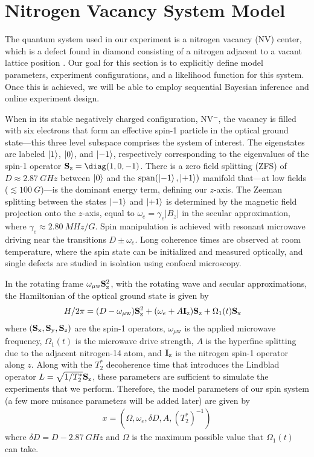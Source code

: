 \documentclass[aps,nofootinbib,twocolumn,superscriptaddress]{revtex4}
\newcommand{\mps}{x}
\renewcommand{\H}{H}    %
\renewcommand{\L}{L}    %
\newcommand{\uw}{{\mu\text{w}}}
\begin{document}
\section{Nitrogen Vacancy System Model}
\label{sec:system-model}

The quantum system used in our experiment is a nitrogen vacancy (NV) center,
which is a defect found in diamond consisting of a nitrogen adjacent to
a vacant lattice position \cite{doherty_nitrogen-vacancy_2013}.
Our goal for this section is to explicitly define model parameters, experiment configurations, and a likelihood function for this system.
Once this is achieved, we will be able to employ sequential
Bayesian inference and online experiment design.

When in its stable negatively charged configuration, NV$^-$,
the vacancy is filled with
six electrons that form an effective spin-1 particle in the optical
ground state---this three level subspace comprises the system of interest.
The eigenstates are labeled $\ket{1}$, $\ket{0}$, and $\ket{-1}$, respectively
corresponding to the eigenvalues of the spin-1 operator $\Sz=\diag(1,0,-1)$.
There is a zero field splitting (ZFS) of $D\approx\SI{2.87}{GHz}$
between $\ket{0}$ and the $\operatorname{span}(\ket{-1},\ket{+1})$ manifold
that---at low fields ($\lesssim\SI{100}{G}$)---is the dominant energy term,
defining our $z$-axis.
The Zeeman splitting between the states $\ket{-1}$ and $\ket{+1}$
is determined by the magnetic field projection onto the $z$-axis, equal to
$\omega_e=\gamma_e |B_z|$ in the secular approximation,
where $\gamma_e\approx\SI{2.80}{MHz/G}$.
Spin manipulation is achieved with resonant microwave driving near
the transitions $D\pm\omega_e$.
Long coherence times are observed at room temperature, where
the spin state can be initialized and measured optically, and single
defects are studied in isolation using confocal microscopy.

In the rotating frame $\omega_\uw \Sz^2$,
with the rotating wave and secular approximations,
the Hamiltonian of the optical ground state is given by
\begin{align}
    \H/2\pi &= (D-\omega_\uw)\Sz^2 + (\omega_e+A \Iz)\Sz + \Omega_1(t)\Sx
\end{align}
where $(\mathbf{S}_{\text{x}},\mathbf{S}_{\text{y}},\mathbf{S}_{\text{z}})$ are the spin-1 operators, $\omega_\uw$ is the applied
microwave frequency, $\Omega_1(t)$ is the microwave drive strength, $A$ is
the hyperfine splitting  due to the adjacent nitrogen-14 atom, and $\mathbf{I}_{\text{z}}$
is the nitrogen spin-1 operator along $z$.
Along with the $T_2^*$ decoherence time that introduces the
Lindblad operator $\L=\sqrt{1/T_2^*}\Sz$, these parameters are sufficient
to simulate the experiments that we perform.
Therefore, the model parameters of our spin system (a few
more nuisance parameters will be added later) are given by
\begin{align}
    \mps=(\Omega,\omega_e,\delta D,A,(T_2^*)^{-1})
\end{align}
where $\delta D=D-\SI{2.87}{GHz}$ and $\Omega$ is the maximum possible
value that $\Omega_1(t)$ can take.
\end{document}
